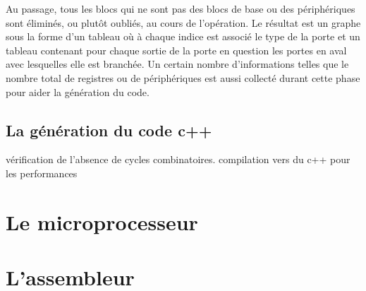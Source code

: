 \documentclass[13pt]{article}
\begin{document}
Au passage, tous les blocs qui ne sont pas des blocs de base ou des
périphériques sont éliminés, ou plutôt oubliés, au cours de l'opération.
Le résultat est un graphe sous la forme d'un tableau où à chaque indice est
associé le type de la porte et un tableau contenant pour chaque sortie de la
porte en question les portes en aval avec lesquelles elle est branchée. Un
certain nombre d'informations telles que le nombre total de registres ou de
périphériques est aussi collecté durant cette phase pour aider la génération du code. 

\subsection{La génération du code c++}
vérification de l'absence de cycles combinatoires.
compilation vers du c++ pour les performances


\section{Le microprocesseur}

\section{L'assembleur}
\end{document}
